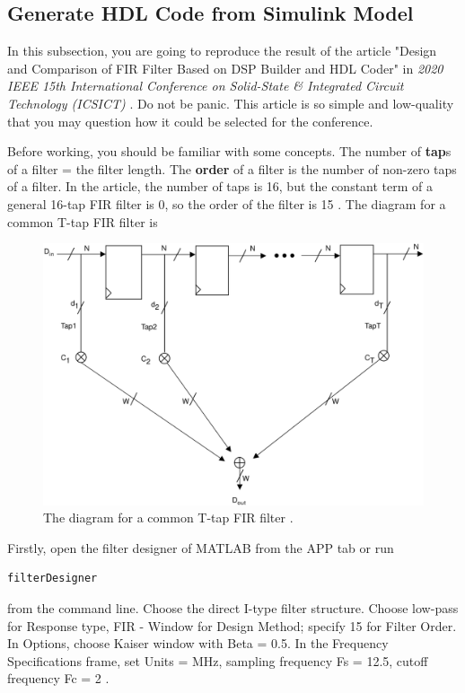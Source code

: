 \documentclass[a4paper,12pt,twoside]{article}
\begin{document}
\subsection{Generate HDL Code from Simulink Model}
In this subsection, you are going to reproduce the result of the article "Design and Comparison of FIR Filter Based on DSP Builder and HDL Coder" in \textit{2020 IEEE 15th International Conference on Solid-State \& Integrated Circuit Technology (ICSICT)} \cite{9278259}. Do not be panic. This article is so simple and low-quality that you may question how it could be selected for the conference.

Before working, you should be familiar with some concepts. The number of \textbf{tap}s of a filter = the filter length. The \textbf{order} of a filter is the number of non-zero taps of a filter. In the article, the number of taps is 16, but the constant term of a general 16-tap FIR filter is 0, so the order of the filter is 15 \cite{dspex}. The diagram for a common T-tap FIR filter is
\begin{figure}[H]
    \centering
    \includegraphics[width=\textwidth]{images/31.png}
    \caption{The diagram for a common T-tap FIR filter \cite{firan}.}
\end{figure}
Firstly, open the filter designer of MATLAB from the APP tab or run
\begin{verbatim}
filterDesigner
\end{verbatim}
from the command line. Choose the direct I-type filter structure. Choose low-pass for Response type, FIR - Window for Design Method; specify 15 for Filter Order. In Options, choose Kaiser window with Beta = 0.5. In the Frequency Specifications frame, set Units = MHz, sampling frequency Fs = 12.5, cutoff frequency Fc = 2 \cite{firbeamer}.
\end{document}
